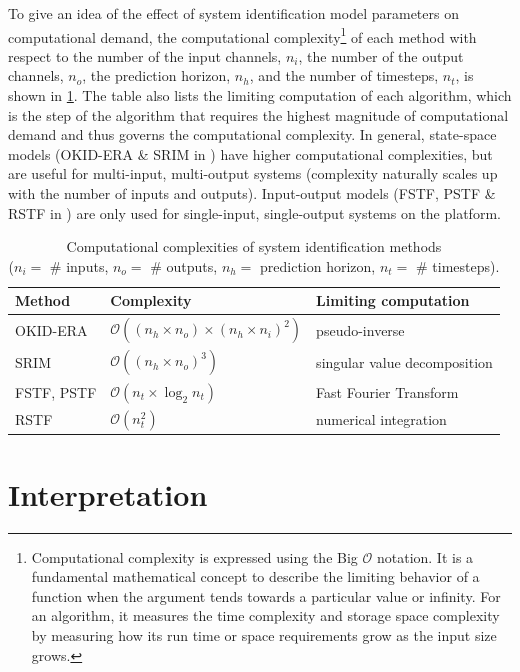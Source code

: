To give an idea of the effect of system identification model parameters on computational demand, the computational complexity{\footnote{Computational complexity is expressed using the Big $\mathcal{O}$ notation. It is a fundamental mathematical concept to describe the limiting behavior of a function when the argument tends towards a particular value or infinity. For an algorithm, it measures the time complexity and storage space complexity by measuring how its run time or space requirements grow as the input size grows.}} of each method with respect to the number of the input channels, $n_{i}$, the number of the output channels, $n_{o}$, the prediction horizon, $n_{h}$, and the number of timesteps, $n_{t}$, is shown in \cref{tab:sysid_complexities}. 
The table also lists the limiting computation of each algorithm, which is the step of the algorithm that requires the highest magnitude of computational demand and thus governs the computational complexity. In general, state-space models (OKID-ERA \& SRIM in \BRACE{}) have higher computational complexities, but are useful for multi-input, multi-output systems (complexity naturally scales up with the number of inputs and outputs). Input-output models (FSTF, PSTF \& RSTF in \BRACE{}) are only used for single-input, single-output systems on the \BRACE{} platform.
\begin{table}[h!]
    \centering
    \begin{tabular}{lll}
\toprule
        \textbf{Method} & \textbf{Complexity} & \textbf{Limiting computation}\\
        \hline
        OKID-ERA & $\mathcal{O}\left((n_{h} \times n_{o}) \times (n_{h} \times n_{i})^{2}\right)$ & pseudo-inverse\\
        SRIM & $\mathcal{O}\left((n_{h} \times n_{o})^{3}\right)$ & singular value decomposition\\
        FSTF, PSTF & $\mathcal{O}\left(n_{t} \times \log_{2}{n_{t}}\right)$ & Fast Fourier Transform \\
        RSTF & $\mathcal{O}\left(n_{t}^{2}\right)$ & numerical integration \\
\bottomrule
    \end{tabular}
    \caption{Computational complexities of system identification methods \\ ($n_{i} = $ \# inputs, $n_{o} = $ \# outputs, $n_{h} = $ prediction horizon, $n_{t} = $ \# timesteps).}
    \label{tab:sysid_complexities}
\end{table}


\section{Interpretation}\label{sec:interpret_sysid}

